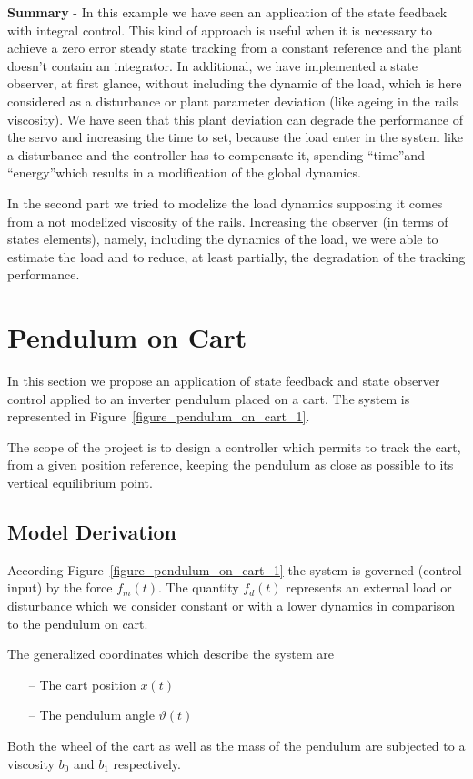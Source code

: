 \documentclass[11pt,a4paper,oneside]{book}
\numberwithin{equation}{section}
\theoremstyle{it}
\theoremstyle{definition}
\begin{document}
\textbf{Summary} - In this example we have seen an application of the state 
feedback with integral control. This kind of approach is useful when it is 
necessary to achieve a zero error steady state tracking from a constant 
reference and the plant doesn't contain an integrator. In additional, we have 
implemented a state observer, at first glance, without including the dynamic of 
the load, which is here considered as a disturbance or plant parameter 
deviation (like ageing in the rails viscosity). We have seen that this plant 
deviation can degrade the performance of the servo and increasing the time to 
set, because the load enter in the system like a disturbance and the controller 
has to compensate it, spending \textquotedblleft time\textquotedblright  and 
\textquotedblleft energy\textquotedblright  which results in a modification of 
the global dynamics.

In the second part we tried to modelize the load dynamics supposing it comes from 
a not modelized viscosity of the rails. Increasing the observer (in terms of states elements), namely, including the 
dynamics of the load, we were able to estimate the load and to reduce, at least 
partially, the degradation of the tracking performance. 

\section{Pendulum on Cart}
In this section we propose an application of state feedback and state observer 
control applied to an inverter pendulum placed on a cart. The system is represented in 
Figure~\ref{figure_pendulum_on_cart_1}. 

The scope of the project is to design a controller which permits to track the cart, from a given position reference, keeping the pendulum as close as possible to its vertical equilibrium point.
\subsection{Model Derivation}
According Figure~\ref{figure_pendulum_on_cart_1} the system is governed (control input) by the force $f_m(t)$. The quantity $f_d(t)$ represents an external load or disturbance which we consider constant or with a lower dynamics in comparison to the pendulum on cart.

The generalized coordinates which describe the system are 
\begin{itemize}
	\item[--] The cart position $x(t)$
	\item[--] The pendulum angle $\vartheta(t)$
\end{itemize}
Both the wheel of the cart as well as the mass of the pendulum are subjected to a viscosity $b_0$ and $b_1$ respectively.
\end{document}
